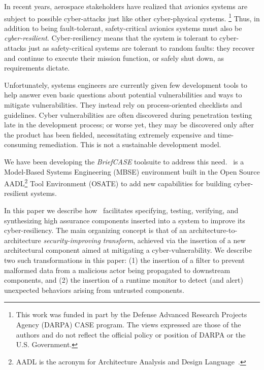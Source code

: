 

In recent years, aerospace stakeholders have realized that avionics
systems are subject to possible cyber-attacks just like other
cyber-physical systems.
%
\footnote{This work was funded in part by the
Defense Advanced Research Projects Agency (DARPA) CASE program.  The views
expressed are those of the authors and do not reflect the official
policy or position of DARPA or the U.S. Government.}
%
Thus, in addition to being fault-tolerant, safety-critical avionics
systems must also be {\em cyber-resilient}.  Cyber-resiliency means
that the system is tolerant to cyber-attacks just as safety-critical
systems are tolerant to random faults: they recover and continue to
execute their mission function, or safely shut down, as requirements
dictate.

Unfortunately, systems engineers are currently given few development
tools to help answer even basic questions about potential
vulnerabilities and ways to mitigate vulnerabilities.  They instead
rely on process-oriented checklists and guidelines.  Cyber
vulnerabilities are often discovered during penetration testing late
in the development process; or worse yet, they may be discovered only
after the product has been fielded, necessitating extremely expensive
and time-consuming remediation. This is not a sustainable development
model.


We have been developing the {\em BriefCASE} toolsuite to address this need.
\brfcs\ is a Model-Based Systems Engineering (MBSE) environment
built in the Open Source AADL\footnote{AADL is the acronym for
Architecture Analysis and Design Language~\cite{aadl}.}  Tool
Environment (OSATE) to add new capabilities for building
cyber-resilient systems.

In this paper we describe how \brfcs\ facilitates specifying, testing,
verifying, and synthesizing high assurance components inserted into a
system to improve its cyber-resiliency.  The main organizing concept
is that of an architecture-to-architecture \emph{security-improving
transform}, achieved via the insertion of a new architectural
component aimed at mitigating a cyber-vulnerability.  We describe two
such transformations in this paper: (1) the insertion of a
filter to prevent malformed data from a malicious actor being
propagated to downstream components, and (2) the insertion of a
runtime monitor to detect (and alert) unexpected behaviors arising
from untrusted components.

